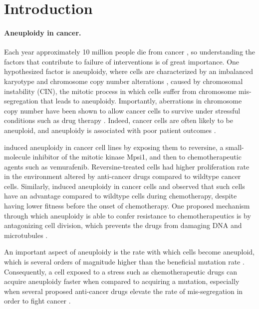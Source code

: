 \documentclass[12pt]{extarticle}
\begin{document}
\newpage
\section*{Introduction}


\paragraph{Aneuploidy in cancer.}  Each year approximately 10 million people die from cancer \citep{kocarnik2022cancer}, so understanding the factors that contribute to failure of interventions is of great importance. One hypothesized factor is aneuploidy, where cells are characterized by an imbalanced karyotype and chromosome copy number alterations \citep{schukken2018cin}, caused by chromosomal instability (CIN), the mitotic process in which cells suffer from chromosome mis-segregation that leads to aneuploidy. Importantly, aberrations in chromosome copy number have been shown to allow cancer cells to survive under stressful conditions such as drug therapy \citep{lukow2021chromosomal,rutledge2016selective}. Indeed, cancer cells are often likely to be aneuploid, and aneuploidy is associated with poor patient outcomes \citep{ben2020context,smith2018systematic}. 

 \citet{ippolito2021gene} induced aneuploidy in cancer cell lines by exposing them to reversine, a small-molecule inhibitor of the mitotic kinase Mpsi1, and then to chemotherapeutic agents such as vemurafenib. Reversine-treated cells had higher proliferation rate in the environment altered by anti-cancer drugs compared to wildtype cancer cells.
 Similarly, \citet{lukow2021chromosomal} induced aneuploidy in cancer cells and observed that such cells have an advantage compared to wildtype cells during chemotherapy, despite having lower fitness before the onset of chemotherapy.
One proposed mechanism through which aneuploidy is able to confer resistance to chemotherapeutics is by antagonizing cell division, which prevents the drugs from damaging DNA and microtubules \citep{replogle2020aneuploidy}.
 
An important aspect of aneuploidy is the rate with which cells become aneuploid, which is several orders of magnitude higher than the beneficial mutation rate \citep{bakker2023predicting}. Consequently, a cell exposed to a stress such as chemotherapeutic drugs can acquire aneuploidy faster when compared to acquiring a mutation, especially when several proposed anti-cancer drugs elevate the rate of mis-segregation in order to fight cancer \citep{lee2016effects}.
\end{document}
